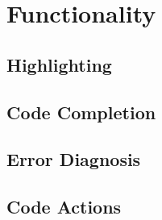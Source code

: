 \documentclass[../main.tex]{subfiles}
\begin{document}
\chapter{Functionality}
\section{Highlighting}
\section{Code Completion}
\section{Error Diagnosis}
\section{Code Actions}
\end{document}
